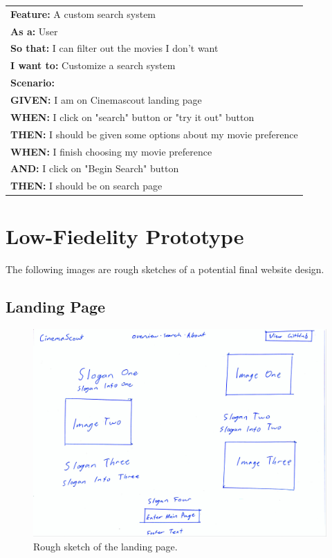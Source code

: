 \documentclass{article}
\begin{document}
\begin{table}[H]
\begin{tabular}{|l|}
\hline
\textbf{Feature:} A custom search system\\
\textbf{As a:} User\\
\textbf{So that:} I can filter out the movies I don't want\\
\textbf{I want to:} Customize a search system\\
\textbf{Scenario:} \\
\textbf{GIVEN:} I am on Cinemascout landing page\\
\textbf{WHEN:} I click on "search" button or "try it out" button\\
\textbf{THEN:} I should be given some options about my movie preference\\
\textbf{WHEN:} I finish choosing my movie preference\\
\textbf{AND:} I click on "Begin Search" button\\
\textbf{THEN:} I should be on search page\\
\hline
\end{tabular}
\end{table}
\fi

\section{Low-Fiedelity Prototype}
The following images are rough sketches of a potential final website design.
\subsection{Landing Page}
\begin{figure}[H]
\includegraphics[width=\columnwidth]{res/landing.jpg}
\caption{Rough sketch of the landing page.}
\end{figure}
\end{document}
